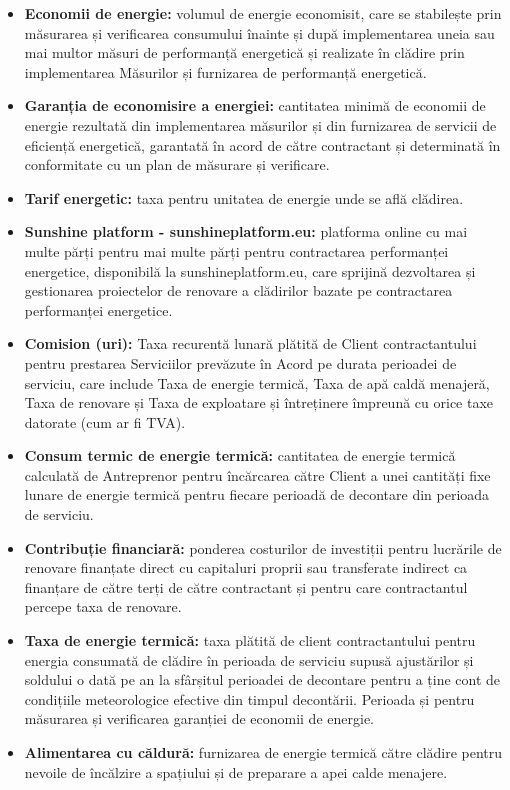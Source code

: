 \begin{multicols}{2}
\begin{itemize}[label={}]
\item\textbf{Economii de energie:} volumul de energie economisit, care se stabilește prin măsurarea și verificarea consumului înainte și după implementarea uneia sau mai multor măsuri de performanță energetică și realizate în clădire prin implementarea Măsurilor și furnizarea de performanță energetică.
\item\textbf{Garanția de economisire a energiei:} cantitatea minimă de economii de energie rezultată din implementarea măsurilor și din furnizarea de servicii de eficiență energetică, garantată în acord de către contractant și determinată în conformitate cu un plan de măsurare și verificare.
\item\textbf{Tarif energetic:} taxa pentru unitatea de energie unde se află clădirea.
\item\textbf{Sunshine platform - sunshineplatform.eu:} platforma online cu mai multe părți pentru mai multe părți pentru contractarea performanței energetice, disponibilă la sunshineplatform.eu, care sprijină dezvoltarea și gestionarea proiectelor de renovare a clădirilor bazate pe contractarea performanței energetice.
\item\textbf{Comision (uri):} Taxa recurentă lunară plătită de Client contractantului pentru prestarea Serviciilor prevăzute în Acord pe durata perioadei de serviciu, care include Taxa de energie termică, Taxa de apă caldă menajeră, Taxa de renovare și Taxa de exploatare și întreținere împreună cu orice taxe datorate (cum ar fi TVA).
\item\textbf{Consum termic de energie termică:} cantitatea de energie termică calculată de Antreprenor pentru încărcarea către Client a unei cantități fixe lunare de energie termică pentru fiecare perioadă de decontare din perioada de serviciu.
\item\textbf{Contribuție financiară:} ponderea costurilor de investiții pentru lucrările de renovare finanțate direct cu capitaluri proprii sau transferate indirect ca finanțare de către terți de către contractant și pentru care contractantul percepe taxa de renovare.
\item\textbf{Taxa de energie termică:} taxa plătită de client contractantului pentru energia consumată de clădire în perioada de serviciu supusă ajustărilor și soldului o dată pe an la sfârșitul perioadei de decontare pentru a ține cont de condițiile meteorologice efective din timpul decontării. Perioada și pentru măsurarea și verificarea garanției de economii de energie.
\item\textbf{Alimentarea cu căldură:} furnizarea de energie termică către clădire pentru nevoile de încălzire a spațiului și de preparare a apei calde menajere.

\end{itemize}
\end{multicols}
